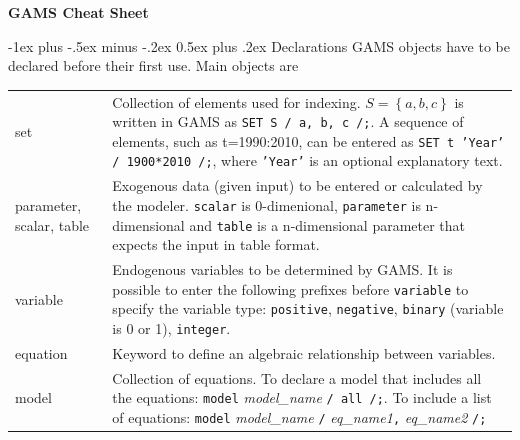 \documentclass[10pt,landscape,a4paper]{article}
\makeatletter
\renewcommand{\section}{\@startsection{section}{1}{0mm}%
                                {-1ex plus -.5ex minus -.2ex}%
                                {0.5ex plus .2ex}%
                                {\color{blue}\normalfont\large\bfseries}}
\makeatother
\begin{document}
\raggedright
\footnotesize
\begin{multicols}{2}


\setlength{\premulticols}{1pt}
\setlength{\postmulticols}{1pt}
\setlength{\multicolsep}{1pt}
\setlength{\columnsep}{2pt}

\begin{center}
     \Large{\textbf{GAMS Cheat Sheet}} \\
\end{center}

\section{Declarations}
GAMS objects have to be declared before their first use. Main objects are\\
\begin{tabularx}{\columnwidth}{@{}>{\ttfamily}l>{\raggedright\arraybackslash}X@{}}
  set & Collection of elements used for indexing. $S=\left\{a,b,c\right\}$ is
  written in GAMS as \texttt{SET S / a, b, c /;}. A sequence of elements, such
  as t=1990:2010, can be entered as \texttt{SET t 'Year' / 1900*2010 /;}, where
  \texttt{'Year'} is an optional
  explanatory text.\\
  parameter\textrm{, }scalar\textrm{, }table & Exogenous data (given input) to
  be entered or calculated by the modeler. \texttt{scalar} is 0-dimenional,
  \texttt{parameter} is n-dimensional and \texttt{table} is a n-dimensional parameter
  that expects the input in table format.
  \\
  variable & Endogenous variables to be determined by GAMS. It is possible to
  enter the following prefixes before \texttt{variable} to specify the variable
  type:
  \texttt{positive}, \texttt{negative}, \texttt{binary} (variable is 0 or 1), \texttt{integer}.\\
  equation   & Keyword to define an algebraic relationship between variables. \\
  model & Collection of equations. To declare a model that includes all the
  equations:\linebreak{} \texttt{model} \emph{model\_name} \texttt{/ all
    /;}. \linebreak{}To include a list of equations:\linebreak{} \texttt{model}
  \emph{model\_name} \texttt{/} \emph{eq\_name1}\texttt{,} \emph{eq\_name2}
  \texttt{/;}
\end{tabularx}


\end{multicols}
\end{document}
